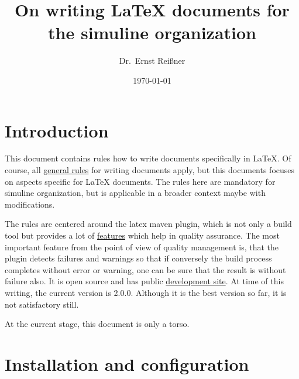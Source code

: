 \documentclass[a4paper,12pt]{article}
\title{On writing \LaTeX{} documents for the simuline organization}
\author{Dr.~Ernst Reißner}
\date{\today}
\newcommand{\siteref}[2]{\href{http://www.simuline.eu/QualityManagement/#1}{#2}}
\begin{document}
\maketitle


\newpage

\tableofcontents %
\lstlistoflistings%
\newpage 

\section{Introduction}

This document contains rules how to write documents specifically in \LaTeX. 
Of course, all \siteref{WritingRules/writingRules.html}{general rules} 
for writing documents apply, 
but this documents focuses on aspects specific for \LaTeX{} documents. 
The rules here are mandatory for simuline organization, 
but is applicable in a broader context maybe with modifications. 

The rules are centered around the latex maven plugin, 
which is not only a build tool 
but provides a lot of \href{http://www.simuline.eu/LatexMavenPlugin/features.html}{features} 
which help in quality assurance. 
The most important feature from the point of view of quality management is, 
that the plugin detects failures and warnings so 
that if conversely the build process completes without error or warning, 
one can be sure that the result is without failure also. 
It is open source and has public \href{https://github.com/Reissner/latex-maven-plugin}{development site}. 
At time of this writing, the current version is 2.0.0. 
Although it is the best version so far, 
it is not satisfactory still. 


At the current stage, this document is only a torso. 


\section{Installation and configuration}\label{sec:instConfig}
\end{document}
